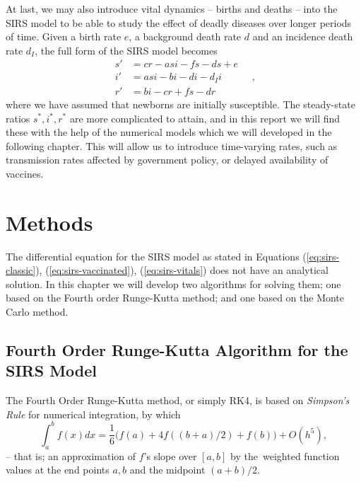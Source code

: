 \documentclass[]{article}
\begin{document}
At last, we may also introduce vital dynamics -- births and deaths -- into the SIRS model to be able to study the effect of deadly diseases over longer periods of time. Given a birth rate $e$, a background death rate $d$ and an incidence death rate $d_I$, the full form of the SIRS model becomes
\begin{equation} \label{eq:sirs-vitals}
\begin{aligned}
	s' &= cr - asi - fs - ds + e \\
	i' &= asi - bi - di -d_Ii\\
	r' &= bi - cr + fs - dr
\end{aligned} \quad ,
\end{equation}
where we have assumed that newborns are initially susceptible. The steady-state ratios $s^*, i^*, r^*$ are more complicated to attain, and in this report we will find these with the help of the numerical models which we will developed in the following chapter. This will allow us to introduce time-varying rates, such as transmission rates affected by government policy, or delayed availability of vaccines. 

\section{Methods} \label{sec:methods}

The differential equation for the SIRS model as stated in Equations (\ref{eq:sirs-classic}), (\ref{eq:sirs-vaccinated}), (\ref{eq:sirs-vitals}) does not have an analytical solution. In this chapter we will develop two algorithms for solving them; one based on the Fourth order Runge-Kutta method; and one based on the Monte Carlo method.

\subsection{Fourth Order Runge-Kutta Algorithm for the SIRS Model} \label{sec:runge-kutta}
The Fourth Order Runge-Kutta method, or simply RK4, is based on \textit{Simpson's Rule} for numerical integration, by which
\begin{equation} \label{eq:simpsons-rule}
	\int_{a}^{b} f(x) dx = \frac{1}{6} \big( f(a) + 4f((b+a)/2) + f(b) \big) + O(h^5),
\end{equation}
-- that is; an approximation of $f$'s slope over $[a,b]$ by the weighted function values at the end points $a,b$ and the midpoint $(a+b)/2$.
\end{document}

